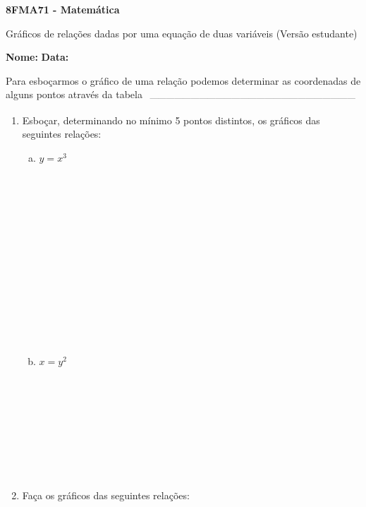 \documentclass[a4paper,14pt]{article}
\begin{document}
	
	\noindent\textbf{8FMA71 - Matemática} 
	
	\begin{center}Gráficos de relações dadas por uma equação de duas variáveis (Versão estudante)
	\end{center}
	
	\noindent\textbf{Nome:} \underline{\hspace{10cm}}
	\noindent\textbf{Data:} \underline{\hspace{4cm}}
	
	
	
    \begin{multicols}{2}
    	\noindent Para esboçarmos o gráfico de uma relação podemos determinar as coordenadas de alguns pontos através da tabela
    	\noindent\textsubscript{~---------------------------------------------------------------------------}
		\begin{enumerate}
			\item Esboçar, determinando no mínimo 5 pontos distintos, os gráficos das seguintes relações:
			\begin{enumerate}[a)]
				\item $y = x^3$ \\\\\\\\\\\\\\\\\\\\\\\\\\\\
				\item $x = y^2$ \\\\\\\\\\\\\\\\\\
			\end{enumerate}
		    \item Faça os gráficos das seguintes relações:
		    \begin{enumerate}[a)]

\end{enumerate}
\end{enumerate}
\end{multicols}
\end{document}
